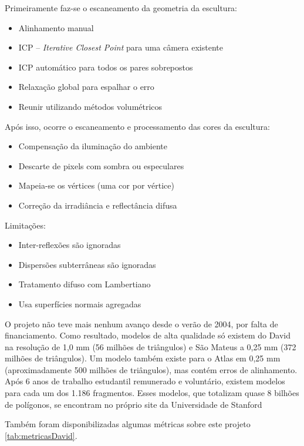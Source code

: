 Primeiramente faz-se o escaneamento da geometria da escultura:
\begin{itemize}
\item{Alinhamento manual}
\item{ICP -- {\it Iterative Closest Point} para uma câmera existente} %
\item{ICP automático para todos os pares sobrepostos}
\item{Relaxação global para espalhar o erro}
\item{Reunir utilizando métodos volumétricos}
\end{itemize}


Após isso, ocorre o escaneamento e processamento das cores da escultura:

\begin{itemize}
\item{Compensação da iluminação do ambiente}
\item{Descarte de pixels com sombra ou especulares}
\item{Mapeia-se os vértices (uma cor por vértice)}
\item{Correção da irradiância e reflectância difusa}
\end{itemize}

Limitações:
\begin{itemize}
\item{Inter-reflexões são ignoradas}
\item{Dispersões subterrâneas são ignoradas}
\item{Tratamento difuso com Lambertiano} %
\item{Usa superfícies normais agregadas}
\end{itemize}

O projeto não teve mais nenhum avanço desde o verão de 2004, por falta de financiamento. Como resultado, modelos de alta qualidade só existem do David na resolução de 1,0 mm (56 milhões de triângulos) e São Mateus a 0,25 mm (372 milhões de triângulos). Um modelo também existe para o Atlas em 0,25 mm (aproximadamente 500 milhões de triângulos), mas contém erros de alinhamento. Após 6 anos de trabalho estudantil remunerado e voluntário, existem modelos para cada um dos 1.186 fragmentos. Esses modelos, que totalizam quase 8 bilhões de polígonos, se encontram no próprio site da Universidade de Stanford %

Também foram disponibilizadas algumas métricas sobre este projeto \ref{tab:metricasDavid}.

